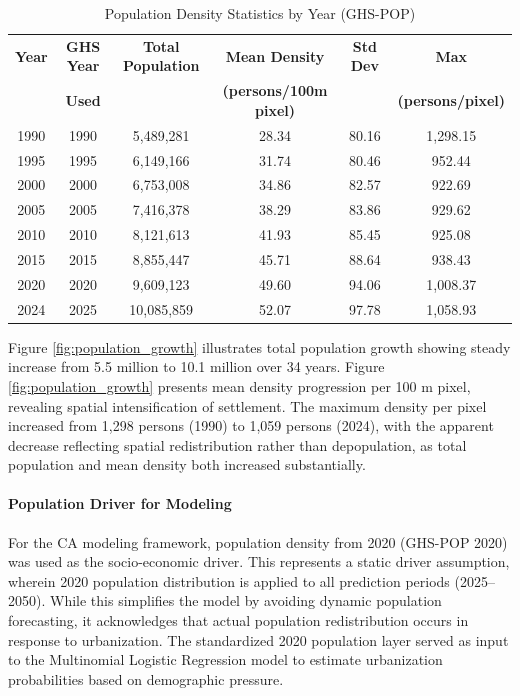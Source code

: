 \documentclass[conference]{IEEEtran}
\begin{document}
\begin{table}[!t]
\caption{Population Density Statistics by Year (GHS-POP)}
\label{tab:population_stats}
\centering
\small
\renewcommand{\arraystretch}{1.2}
\begin{tabular}{cccccc}
\toprule
\textbf{Year} & \textbf{GHS Year} & \textbf{Total Population} & \textbf{Mean Density} & \textbf{Std Dev} & \textbf{Max} \\
 & \textbf{Used} & & \textbf{(persons/100m pixel)} & & \textbf{(persons/pixel)} \\
\midrule
1990 & 1990 & 5,489,281 & 28.34 & 80.16 & 1,298.15 \\
1995 & 1995 & 6,149,166 & 31.74 & 80.46 & 952.44 \\
2000 & 2000 & 6,753,008 & 34.86 & 82.57 & 922.69 \\
2005 & 2005 & 7,416,378 & 38.29 & 83.86 & 929.62 \\
2010 & 2010 & 8,121,613 & 41.93 & 85.45 & 925.08 \\
2015 & 2015 & 8,855,447 & 45.71 & 88.64 & 938.43 \\
2020 & 2020 & 9,609,123 & 49.60 & 94.06 & 1,008.37 \\
2024 & 2025 & 10,085,859 & 52.07 & 97.78 & 1,058.93 \\
\bottomrule
\end{tabular}
\end{table}

Figure \ref{fig:population_growth} illustrates total population growth showing steady increase from 5.5 million to 10.1 million over 34 years. Figure \ref{fig:population_growth} presents mean density progression per 100 m pixel, revealing spatial intensification of settlement. The maximum density per pixel increased from 1,298 persons (1990) to 1,059 persons (2024), with the apparent decrease reflecting spatial redistribution rather than depopulation, as total population and mean density both increased substantially.


\paragraph{Population Driver for Modeling}
For the CA modeling framework, population density from 2020 (GHS-POP 2020) was used as the socio-economic driver. This represents a static driver assumption, wherein 2020 population distribution is applied to all prediction periods (2025--2050). While this simplifies the model by avoiding dynamic population forecasting, it acknowledges that actual population redistribution occurs in response to urbanization. The standardized 2020 population layer served as input to the Multinomial Logistic Regression model to estimate urbanization probabilities based on demographic pressure.
\end{document}
